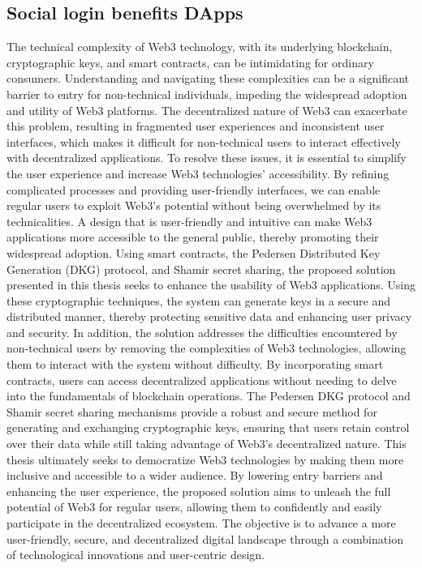 \documentclass[../Main.tex]{subfiles}
\begin{document}
\subsection{Social login benefits DApps}
The technical complexity of Web3 technology, with its underlying blockchain, cryptographic keys, and smart contracts, can be intimidating for ordinary consumers. Understanding and navigating these complexities can be a significant barrier to entry for non-technical individuals, impeding the widespread adoption and utility of Web3 platforms. The decentralized nature of Web3 can exacerbate this problem, resulting in fragmented user experiences and inconsistent user interfaces, which makes it difficult for non-technical users to interact effectively with decentralized applications. To resolve these issues, it is essential to simplify the user experience and increase Web3 technologies' accessibility. By refining complicated processes and providing user-friendly interfaces, we can enable regular users to exploit Web3's potential without being overwhelmed by its technicalities. A design that is user-friendly and intuitive can make Web3 applications more accessible to the general public, thereby promoting their widespread adoption. Using smart contracts, the Pedersen Distributed Key Generation (DKG) protocol, and Shamir secret sharing, the proposed solution presented in this thesis seeks to enhance the usability of Web3 applications. Using these cryptographic techniques, the system can generate keys in a secure and distributed manner, thereby protecting sensitive data and enhancing user privacy and security. In addition, the solution addresses the difficulties encountered by non-technical users by removing the complexities of Web3 technologies, allowing them to interact with the system without difficulty. By incorporating smart contracts, users can access decentralized applications without needing to delve into the fundamentals of blockchain operations. The Pedersen DKG protocol and Shamir secret sharing mechanisms provide a robust and secure method for generating and exchanging cryptographic keys, ensuring that users retain control over their data while still taking advantage of Web3's decentralized nature. This thesis ultimately seeks to democratize Web3 technologies by making them more inclusive and accessible to a wider audience. By lowering entry barriers and enhancing the user experience, the proposed solution aims to unleash the full potential of Web3 for regular users, allowing them to confidently and easily participate in the decentralized ecosystem. The objective is to advance a more user-friendly, secure, and decentralized digital landscape through a combination of technological innovations and user-centric design.








\end{document}
